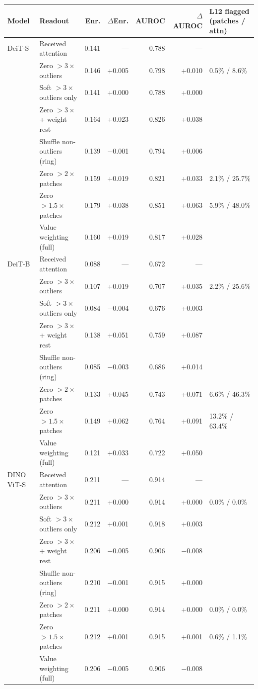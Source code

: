 \begin{tabular}{@{}llrrrrl@{}}
\toprule
Model & Readout & Enr. & $\Delta$Enr. & AUROC & $\Delta$AUROC & L12 flagged (patches / attn) \\
\midrule
DeiT-S & Received attention & 0.141 & --- & 0.788 & --- &  \\
 & Zero $>3\times$ outliers & 0.146 & +0.005 & 0.798 & +0.010 & 0.5\% / 8.6\% \\
 & Soft $>3\times$ outliers only & 0.141 & +0.000 & 0.788 & +0.000 &  \\
 & Zero $>3\times$ + weight rest & 0.164 & +0.023 & 0.826 & +0.038 &  \\
 & Shuffle non-outliers (ring) & 0.139 & $-$0.001 & 0.794 & +0.006 &  \\
 & Zero $>2\times$ patches & 0.159 & +0.019 & 0.821 & +0.033 & 2.1\% / 25.7\% \\
 & Zero $>1.5\times$ patches & 0.179 & +0.038 & 0.851 & +0.063 & 5.9\% / 48.0\% \\
 & Value weighting (full) & 0.160 & +0.019 & 0.817 & +0.028 &  \\
\midrule
DeiT-B & Received attention & 0.088 & --- & 0.672 & --- &  \\
 & Zero $>3\times$ outliers & 0.107 & +0.019 & 0.707 & +0.035 & 2.2\% / 25.6\% \\
 & Soft $>3\times$ outliers only & 0.084 & $-$0.004 & 0.676 & +0.003 &  \\
 & Zero $>3\times$ + weight rest & 0.138 & +0.051 & 0.759 & +0.087 &  \\
 & Shuffle non-outliers (ring) & 0.085 & $-$0.003 & 0.686 & +0.014 &  \\
 & Zero $>2\times$ patches & 0.133 & +0.045 & 0.743 & +0.071 & 6.6\% / 46.3\% \\
 & Zero $>1.5\times$ patches & 0.149 & +0.062 & 0.764 & +0.091 & 13.2\% / 63.4\% \\
 & Value weighting (full) & 0.121 & +0.033 & 0.722 & +0.050 &  \\
\midrule
DINO ViT-S & Received attention & 0.211 & --- & 0.914 & --- &  \\
 & Zero $>3\times$ outliers & 0.211 & +0.000 & 0.914 & +0.000 & 0.0\% / 0.0\% \\
 & Soft $>3\times$ outliers only & 0.212 & +0.001 & 0.918 & +0.003 &  \\
 & Zero $>3\times$ + weight rest & 0.206 & $-$0.005 & 0.906 & $-$0.008 &  \\
 & Shuffle non-outliers (ring) & 0.210 & $-$0.001 & 0.915 & +0.000 &  \\
 & Zero $>2\times$ patches & 0.211 & +0.000 & 0.914 & +0.000 & 0.0\% / 0.0\% \\
 & Zero $>1.5\times$ patches & 0.212 & +0.001 & 0.915 & +0.001 & 0.6\% / 1.1\% \\
 & Value weighting (full) & 0.206 & $-$0.005 & 0.906 & $-$0.008 &  \\
\bottomrule
\end{tabular}
